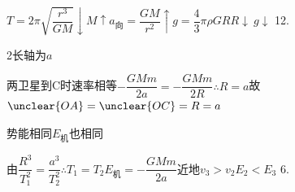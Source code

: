 \hspace{4em}$T=2\pi\sqrt{\dfrac{r^3}{GM}}\downarrow$\quad $M\uparrow$\quad $a_{\text{向}}=\dfrac{GM}{r^2}\uparrow$\quad $g=\dfrac43\pi\rho GR$\quad $R\downarrow\ g\downarrow$
12.

2长轴为$a$

两卫星到C时速率相等\quad $-\dfrac{GMm}{2a}=-\dfrac{GMm}{2R}$\quad $\therefore R=a$\quad 故$\unclear{OA}=\unclear{OC}=R=a$

势能相同\qquad $E_{\text{机}}$也相同

由$\dfrac{R^3}{T_1^2}=\dfrac{a^3}{T_2^2}$\quad $\therefore T_1=T_2$\qquad $E_{\text{机}}=-\dfrac{GMm}{2a}$\qquad 近地$v_3>v_2$\qquad $E_2<E_3$
6.

